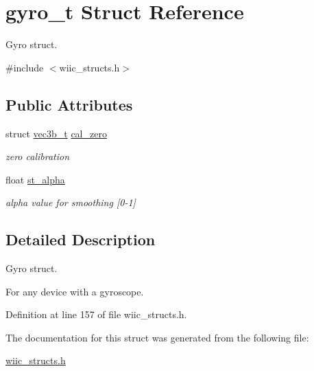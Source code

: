 \hypertarget{structgyro__t}{\section{gyro\-\_\-t Struct Reference}
\label{structgyro__t}
}


Gyro struct.  




{\ttfamily \#include $<$wiic\-\_\-structs.\-h$>$}

\subsection*{Public Attributes}
\begin{DoxyCompactItemize}
\item 
\hypertarget{structgyro__t_a1a2b1fdd479dd7cbd2f70b2a2cd93e0b}{struct \hyperlink{structvec3b__t}{vec3b\-\_\-t} \hyperlink{structgyro__t_a1a2b1fdd479dd7cbd2f70b2a2cd93e0b}{cal\-\_\-zero}}\label{structgyro__t_a1a2b1fdd479dd7cbd2f70b2a2cd93e0b}

\begin{DoxyCompactList}\small\item\em zero calibration \end{DoxyCompactList}\item 
\hypertarget{structgyro__t_a05d652ae9beed165d906573c002c7560}{float \hyperlink{structgyro__t_a05d652ae9beed165d906573c002c7560}{st\-\_\-alpha}}\label{structgyro__t_a05d652ae9beed165d906573c002c7560}

\begin{DoxyCompactList}\small\item\em alpha value for smoothing \mbox{[}0-\/1\mbox{]} \end{DoxyCompactList}\end{DoxyCompactItemize}


\subsection{Detailed Description}
Gyro struct. 

For any device with a gyroscope. 

Definition at line 157 of file wiic\-\_\-structs.\-h.



The documentation for this struct was generated from the following file\-:\begin{DoxyCompactItemize}
\item 
\hyperlink{wiic__structs_8h}{wiic\-\_\-structs.\-h}\end{DoxyCompactItemize}
